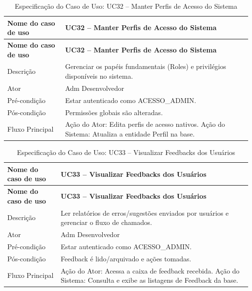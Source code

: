 \fonteautores

\vspace{\baselineskip}

\Needspace{0.48\textheight}
\begin{longtable}{|L{4.5cm}|L{10.5cm}|}
\caption{Especificação do Caso de Uso: UC32 -- Manter Perfis de Acesso do Sistema} \\
\hline
\textbf{Nome do caso de uso} & \textbf{UC32 -- Manter Perfis de Acesso do Sistema} \\
\hline
\endfirsthead
\hline
\textbf{Nome do caso de uso} & \textbf{UC32 -- Manter Perfis de Acesso do Sistema} \\
\hline
\endhead
Descrição       & Gerenciar os papéis fundamentais (Roles) e privilégios disponíveis no sistema. \\
\hline
Ator            & Adm Desenvolvedor \\
\hline
Pré-condição    & Estar autenticado como ACESSO\_ADMIN. \\
\hline
Pós-condição    & Permissões globais são alteradas. \\
\hline
Fluxo Principal & Ação do Ator: Edita perfis de acesso nativos. Ação do Sistema: Atualiza a entidade Perfil na base. \\
\hline
\end{longtable}

\fonteautores

\vspace{\baselineskip}

\Needspace{0.48\textheight}
\begin{longtable}{|L{4.5cm}|L{10.5cm}|}
\caption{Especificação do Caso de Uso: UC33 -- Visualizar Feedbacks dos Usuários} \\
\hline
\textbf{Nome do caso de uso} & \textbf{UC33 -- Visualizar Feedbacks dos Usuários} \\
\hline
\endfirsthead
\hline
\textbf{Nome do caso de uso} & \textbf{UC33 -- Visualizar Feedbacks dos Usuários} \\
\hline
\endhead
Descrição       & Ler relatórios de erros/sugestões enviados por usuários e gerenciar o fluxo de chamados. \\
\hline
Ator            & Adm Desenvolvedor \\
\hline
Pré-condição    & Estar autenticado como ACESSO\_ADMIN. \\
\hline
Pós-condição    & Feedback é lido/arquivado e ações tomadas. \\
\hline
Fluxo Principal & Ação do Ator: Acessa a caixa de feedback recebida. Ação do Sistema: Consulta e exibe as listagens de Feedback da base. \\
\hline
\end{longtable}

\fonteautores

